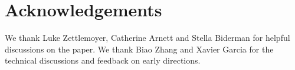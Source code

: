 \section{Acknowledgements}

We thank Luke Zettlemoyer, Catherine Arnett and Stella Biderman for helpful discussions on the paper. We thank Biao Zhang and Xavier Garcia for the technical discussions and feedback on early directions.

